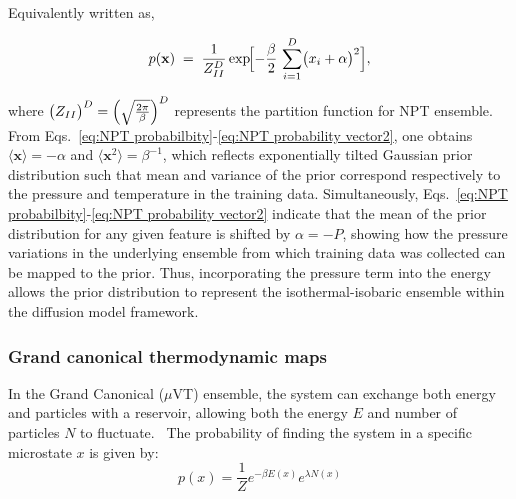 \documentclass[aip,jcp,reprint,longbibliography]{revtex4-1}
\begin{document}
\noindent  Equivalently written as,

\begin{equation}
p(\mathbf{x}) \;=\; \frac{1}{Z_{II}^D} 
  \exp\!\Bigl[-\frac{\beta}{2} \,\sum_{i=1}^D \bigl(x_i + \alpha\bigr)^2\Bigr],
\label{eq:NPT probability vector2}
\end{equation}


\noindent where $\bigl(Z_{II}\bigr)^D = \Bigl(\sqrt{\tfrac{2\pi}{\beta}}\Bigr)^D$ represents the partition function for NPT ensemble. From Eqs.~\ref{eq:NPT probabilbity}-\ref{eq:NPT probability vector2}, one obtains $\langle \mathbf{x}\rangle = -\alpha$ and $\langle \mathbf{x}^2\rangle = \beta^{-1}$, which reflects exponentially tilted Gaussian prior distribution such that mean and variance of the prior correspond respectively to the pressure and temperature in the training data. Simultaneously, Eqs.~\ref{eq:NPT probabilbity}-\ref{eq:NPT probability vector2} indicate that the mean of the prior distribution for any given feature is shifted by $\alpha = - P$, showing how the pressure variations in the underlying ensemble from which training data was collected can be mapped to the prior. Thus, incorporating the pressure term into the energy allows the prior distribution to represent the isothermal-isobaric ensemble within the diffusion model framework.

\subsubsection{Grand canonical thermodynamic maps}
\label{sec:expTM_muVT}

In the Grand Canonical ($\mu$VT) ensemble, the system can exchange both energy and particles with a reservoir, allowing both the energy $E$ and number of particles $N$ to fluctuate.~\cite{Chandler1985Introduction}  The probability of finding the system in a specific microstate $ x $ is given by:
\begin{equation}
    p(x) = \frac{1}{Z} e^{-\beta E(x)} e^{\lambda N(x)}
\end{equation}
\end{document}
